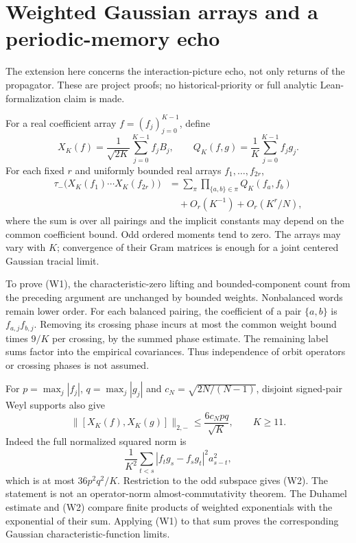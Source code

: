 \section{Weighted Gaussian arrays and a periodic-memory echo}
\label{sec:weighted-echo}

The extension here concerns the interaction-picture echo, not only returns
of the propagator. These are project proofs; no historical-priority or full
analytic Lean-formalization claim is made.

For a real coefficient array $f=(f_j)_{j=0}^{K-1}$, define
\[
 X_K(f)=\frac1{\sqrt{2K}}\sum_{j=0}^{K-1}f_jB_j,
 \qquad Q_K(f,g)=\frac1K\sum_{j=0}^{K-1}f_jg_j.
\]
For each fixed $r$ and uniformly bounded real arrays $f_1,\ldots,f_{2r}$,
\[
 \begin{split}
 \tau_-\bigl(X_K(f_1)\cdots X_K(f_{2r})\bigr)
 &=\sum_{\pi}\prod_{\{a,b\}\in\pi}Q_K(f_a,f_b)\\
 &\quad+O_r(K^{-1})+O_r(K^r/N),
 \end{split}\tag{W1}
\]
where the sum is over all pairings and the implicit constants may depend
on the common coefficient bound. Odd ordered moments tend to zero.
The arrays may vary with $K$; convergence of their Gram matrices is enough
for a joint centered Gaussian tracial limit.

To prove (W1), the characteristic-zero lifting and bounded-component count
from the preceding argument are unchanged by bounded weights. Nonbalanced
words remain lower order. For each balanced pairing, the coefficient of a
pair $\{a,b\}$ is $f_{a,j}f_{b,j}$. Removing its crossing phase incurs at
most the common weight bound times $9/K$ per crossing, by the summed phase
estimate. The remaining label sums factor into the empirical covariances.
Thus independence of orbit operators or crossing phases is not assumed.

For $p=\max_j|f_j|$, $q=\max_j|g_j|$ and
$c_N=\sqrt{2N/(N-1)}$, disjoint signed-pair Weyl supports also give
\[
 \|[X_K(f),X_K(g)]\|_{2,-}
 \leq\frac{6c_Npq}{\sqrt K},\qquad K\geq11.\tag{W2}
\]
Indeed the full normalized squared norm is
\[
 \frac1{K^2}\sum_{t<s}|f_tg_s-f_sg_t|^2a_{s-t}^2,
\]
which is at most $36p^2q^2/K$. Restriction to the odd subspace gives
(W2). The statement is not an operator-norm almost-commutativity theorem.
The Duhamel estimate and (W2) compare finite products of weighted
exponentials with the exponential of their sum. Applying (W1) to that sum
proves the corresponding Gaussian characteristic-function limits.

